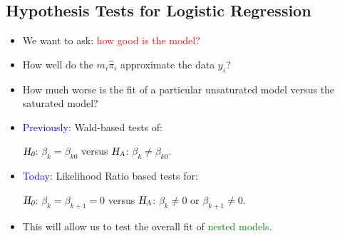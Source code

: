 \documentclass[oneside]{book}\usepackage[]{graphicx}\usepackage[svgnames]{xcolor}
\newcommand{\HN}{\textsl{H}_{\textsl{0}}}%
\newcommand{\HA}{\textsl{H}_{\textsl{A}}}%
\begin{document}
\subsection*{Hypothesis Tests for Logistic Regression}
\begin{itemize}
      \item We want to ask: \textcolor{Red}{how good is the model?}
      \item How well do the $ m_i\hat{\pi}_i $ approximate the data $ y_i $?
      \item How much worse is the fit of a particular unsaturated model versus the saturated
            model?
      \item \textcolor{Blue}{Previously}: Wald-based tests of:
            \begin{center}
                  $ \HN $: $ \beta_k=\beta_{k0} $ versus $ \HA $: $ \beta_k\ne \beta_{k0} $.
            \end{center}
      \item \textcolor{Blue}{Today}: Likelihood Ratio based tests for:
            \begin{center}
                  $ \HN $: $ \beta_k=\beta_{k+1}=0 $ versus $ \HA $: $ \beta_k\ne 0 $ or $ \beta_{k+1}\ne 0 $.
            \end{center}
      \item This will allow us to test the overall fit of \textcolor{Green}{nested models}.
\end{itemize}
\end{document}
